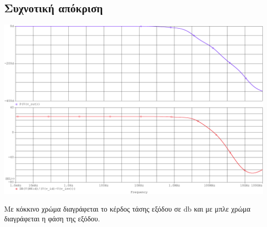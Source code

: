 \subsection{Συχνοτική απόκριση}

\begin{center}
	\begin{plotenv}[H]
		\centering
		\includegraphics[width=\linewidth]{op_amp_sim/bode.pdf}
		\caption{Με κόκκινο χρώμα διαγράφεται το κέρδος τάσης εξόδου σε $\unit{\decibel}$ και με μπλε χρώμα διαγράφεται η φάση της εξόδου.}
		\label{plot:bode}
	\end{plotenv}
\end{center}
\vspace*{-0.5cm}

